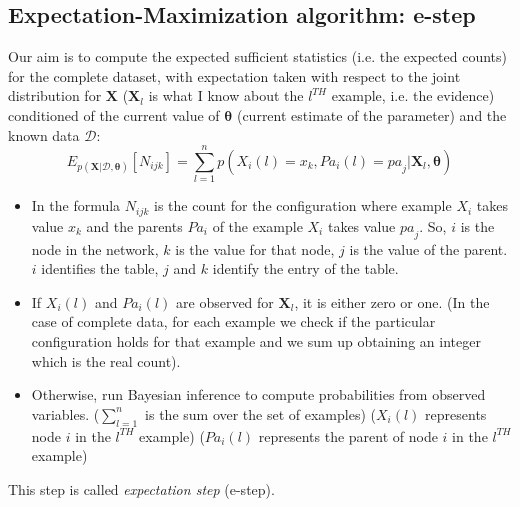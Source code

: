 \subsection{Expectation-Maximization algorithm: e-step}
Our aim is to compute the expected sufficient statistics (i.e. the expected counts) for the complete dataset, with expectation taken with respect to the joint distribution for $\pmb{X}$ ($\pmb{X}_l$ is what I know about the $l^{\mathit{TH}}$ example, i.e. the evidence) conditioned of the current value of $\pmb{\theta}$ (current estimate of the parameter) and the known data $\mathcal{D}$:
\begin{equation}
    E_{p(\pmb{X}|\mathcal{D}, \pmb{\theta})}[N_{ijk}] = \sum_{l=1}^n p(X_i(l) = x_k, \mathit{Pa}_i(l) = \mathit{pa}_j | \pmb{X}_l, \pmb{\theta})
\end{equation}
\begin{itemize}
    \item In the formula $N_{ijk}$ is the count for the configuration where example $X_i$ takes value $x_k$ and the parents $\mathit{Pa}_i$ of the example $X_i$ takes value $\mathit{pa}_j$. So, $i$ is the node in the network, $k$ is the value for that node, $j$ is the value of the parent. $i$ identifies the table, $j$ and $k$ identify the entry of the table.
    
    \item If $X_i(l)$ and $\mathit{Pa}_i(l)$ are observed for $\pmb{X}_l$, it is either zero or one. (In the case of complete data, for each example we check if the particular configuration holds for that example and we sum up obtaining an integer which is the real count).
    
    \item Otherwise, run Bayesian inference to compute probabilities from observed variables. ($\sum_{l=1}^n$ is the sum over the set of examples) ($X_i(l)$ represents node $i$ in the $l^{\mathit{TH}}$ example) ($\mathit{Pa}_i(l)$ represents the parent of node $i$ in the $l^{\mathit{TH}}$ example)
\end{itemize}

This step is called \textit{expectation step} (e-step).

